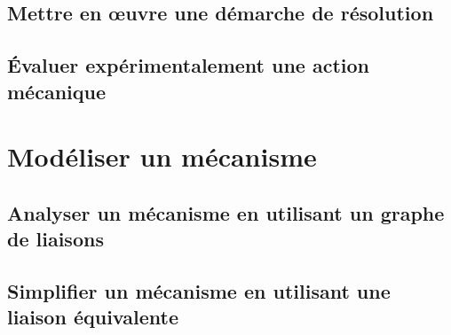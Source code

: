 \graphicspath{{\repStyle/png/}{../STAT/STAT-03-Demarche/04_RR/images/}} 
 
 
\graphicspath{{\repStyle/png/}{../STAT/STAT-03-Demarche/05_RT/images/}} 
 
 
\graphicspath{{\repStyle/png/}{../STAT/STAT-03-Demarche/06_TR/images/}} 
 
 
\graphicspath{{\repStyle/png/}{../STAT/STAT-03-Demarche/07_RR3D/images/}} 
 
 
\graphicspath{{\repStyle/png/}{../STAT/STAT-03-Demarche/08_RR3D/images/}} 
 
 
\graphicspath{{\repStyle/png/}{../STAT/STAT-03-Demarche/14_Sympact/images/}} 
 
 
\graphicspath{{\repStyle/png/}{../STAT/STAT-03-Demarche/55_Suspension/images/}} 
 
 
\graphicspath{{\repStyle/png/}{../STAT/STAT-03-Demarche/57_PeseCamion/images/}} 
 
 
\clearpage 
\newpage 
\section{Mettre en œuvre une démarche de résolution} 
\clearpage 
\newpage 
\section{Évaluer expérimentalement une action mécanique} 
\clearpage 
\newpage 
\setchapterpreamble[u]{\margintoc} 
\chapter{Modéliser un mécanisme} 
\section{Analyser un mécanisme en utilisant un graphe de liaisons} 
\clearpage 
\newpage 
\section{Simplifier un mécanisme en utilisant une liaison équivalente} 
\clearpage 
\newpage 
